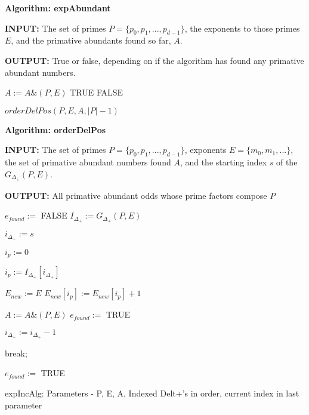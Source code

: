 \documentclass[../paper.tex]{subfiles}
\begin{document}
{\setlength{\parindent}{0cm}

\textbf{Algorithm: expAbundant}

\textbf{INPUT:} The set of primes 
$P = \{p_0, p_1, ..., p_{d-1}\}$, the exponents to those 
primes $E$, and the primative abundants found so far, $A$.

\textbf{OUTPUT:} True or false, depending on if the algorithm has found any
primative abundant numbers.

}

\begin{algorithmic}
		\STATE $A := A \& (P,E)$
		\RETURN TRUE
	\ENDIF
	\RETURN FALSE
\ENDIF

\RETURN $orderDelPos(P,E,A,|P| - 1)$

\end{algorithmic}

{\setlength{\parindent}{0cm}

\textbf{Algorithm: orderDelPos}

\textbf{INPUT:} The set of primes 
$P = \{p_0, p_1, ..., p_{d-1}\}$, exponents $E = \{ m_0, m_1,
...\}$, the set of primative abundant numbers found $A$,
and the starting index $s$ of the $G_{\Delta_{+}}(P,E)$.

\textbf{OUTPUT:} All primative abundant odds whose prime factors
compose $P$

}


\begin{algorithmic}

\STATE $e_{found} :=$ FALSE
\STATE $I_{\Delta_{+}} := G_{ \Delta_{+}}(P,E)$

\STATE $i_{\Delta_{+}} := s$ %

\STATE $i_p := 0$ %

	\STATE $i_p := I_{\Delta_{+}}[ i_{\Delta_{+}} ]$


		\STATE {}
		\STATE $E_{new} := E$
		\STATE $E_{new}[ i_p ] := E_{new}[ i_p ] + 1 $
		
			\STATE $A := A\&(P,E)$
			\STATE $e_{found} := $ TRUE
		\ENDIF

		\STATE $i_{\Delta_{+}} := i_{\Delta_{+}} - 1$  
	
	\ELSE
		\STATE break;
	\ENDIF
\ENDWHILE


	\STATE {}
		\STATE $e_{found} := $ TRUE
	\ENDIF
\ENDIF

\end{algorithmic}
expIncAlg: Parameters - P, E, A, Indexed Delt+'s in order, current index
in last parameter
\end{document}
